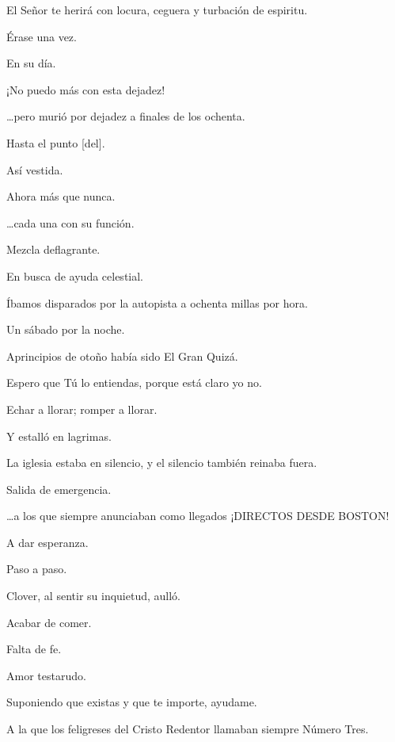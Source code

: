 \sk
El Señor te herirá con locura, ceguera y turbación de espiritu. 

\sk
Érase una vez. 

\sk
En su día. 

\sk
¡No puedo más con esta dejadez!

\sk
\ldots{}pero murió por dejadez a finales de los ochenta.  

\sk
Hasta el punto [del]. 

\sk
Así vestida. 

\sk
Ahora más que nunca. 

\sk
\ldots{}cada una con su función.

\sk
Mezcla deflagrante. 

\sk
En busca de ayuda celestial.

\sk
Íbamos disparados por la autopista a ochenta millas por hora.

\sk
Un sábado por la noche.

\sk
Aprincipios de otoño había sido El Gran Quizá. 

\sk
Espero que Tú lo entiendas, porque está claro yo no.

\sk
Echar a llorar; romper a llorar. 

\sk
Y estalló en lagrimas. 

\sk
La iglesia estaba en silencio, y el silencio también reinaba fuera.

\sk
Salida de emergencia. 

\sk
\ldots{}a los que siempre anunciaban como llegados ¡DIRECTOS DESDE BOSTON!

\sk
A dar esperanza. 

\sk
Paso a paso. 

\sk
Clover, al sentir su inquietud, aulló. 

\sk
Acabar de comer.

\sk
Falta de fe. 

\sk
Amor testarudo. 

\sk
Suponiendo que existas y que te importe, ayudame.

\sk
A la que los feligreses del Cristo Redentor llamaban siempre Número Tres.

